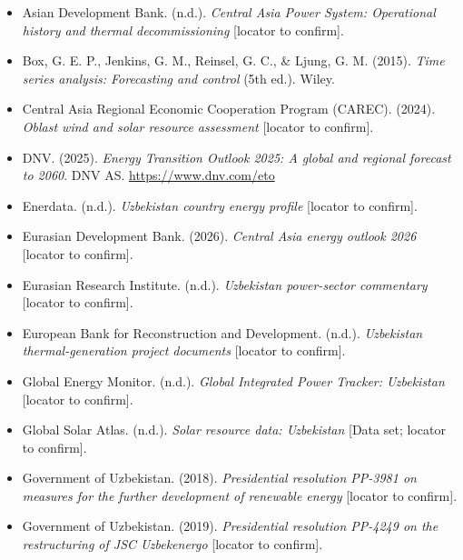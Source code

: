 \documentclass[10pt,twocolumn]{article}
\begin{document}
\begin{itemize}[leftmargin=1.2em,itemsep=1pt,topsep=2pt]

\item Asian Development Bank. (n.d.). \textit{Central Asia Power System: Operational history and thermal decommissioning} [locator to confirm].

\item Box, G. E. P., Jenkins, G. M., Reinsel, G. C., \& Ljung, G. M. (2015). \textit{Time series analysis: Forecasting and control} (5th ed.). Wiley.

\item Central Asia Regional Economic Cooperation Program (CAREC). (2024). \textit{Oblast wind and solar resource assessment} [locator to confirm].

\item DNV. (2025). \textit{Energy Transition Outlook 2025: A global and regional forecast to 2060}. DNV AS. \url{https://www.dnv.com/eto}

\item Enerdata. (n.d.). \textit{Uzbekistan country energy profile} [locator to confirm].

\item Eurasian Development Bank. (2026). \textit{Central Asia energy outlook 2026} [locator to confirm].

\item Eurasian Research Institute. (n.d.). \textit{Uzbekistan power-sector commentary} [locator to confirm].

\item European Bank for Reconstruction and Development. (n.d.). \textit{Uzbekistan thermal-generation project documents} [locator to confirm].

\item Global Energy Monitor. (n.d.). \textit{Global Integrated Power Tracker: Uzbekistan} [locator to confirm].

\item Global Solar Atlas. (n.d.). \textit{Solar resource data: Uzbekistan} [Data set; locator to confirm].

\item Government of Uzbekistan. (2018). \textit{Presidential resolution PP-3981 on measures for the further development of renewable energy} [locator to confirm].

\item Government of Uzbekistan. (2019). \textit{Presidential resolution PP-4249 on the restructuring of JSC Uzbekenergo} [locator to confirm].


\end{itemize}
\end{document}
